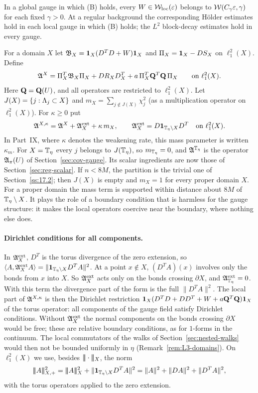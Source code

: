 In a global gauge in which (B) holds, every $W\in\mathcal W_{\rm loc}(\varepsilon)$ belongs to $\mathcal W(C_\gamma\varepsilon,\gamma)$ for each fixed $\gamma>0$. At a regular background the corresponding H\"older estimates hold in each local gauge in which (B) holds; the $L^2$ block-decay estimates hold in every gauge.

For a domain $X$ let $\mathfrak B_X=\mathbf 1_X(D^TD+W)\mathbf 1_X$ and $\Pi_X=\mathbf 1_X-DS_X$ on $\ell^2_1(X)$. Define
\[
\mathfrak A^X=\Pi_X^T\mathfrak B_X\Pi_X+DR_XD^T_X+a\,\Pi_X^T\mathbf Q^T\mathbf Q\,\Pi_X\qquad\text{on }\ell^2_1(X).
\]
Here $\mathbf Q=\mathbf Q(U)$, and all operators are restricted to $\ell^2_1(X)$. Let $J(X)=\{j:\Lambda_j\subset X\}$ and $m_X=\sum_{j\notin J(X)}\chi_j^2$ (as a multiplication operator on $\ell^2_1(X)$). For $\kappa\ge0$ put
\[
\mathfrak A^{X,\kappa}=\mathfrak A^X+\mathfrak A^{\rm ext}_X+\kappa\,m_X,\qquad\mathfrak A^{\rm ext}_X=D\mathbf 1_{\mathbb T_\eta\setminus X}D^T\quad\text{on }\ell^2_1(X).
\]
In Part~IX, where $\kappa$ denotes the weakening rate, this mass parameter is written $\kappa_m$.
For $X=\mathbb T_\eta$ every $j$ belongs to $J(\mathbb T_\eta)$, so $m_{\mathbb T_\eta}=0$, and $\mathfrak A^{\mathbb T_\eta}$ is the operator $\mathfrak A_\pi(U)$ of Section~\ref{sec:cov-gauge}. Its scalar ingredients are now those of Section~\ref{sec:reg-scalar}. If $n<8M$, the partition is the trivial one of Section~\ref{ss:17.2}; then $J(X)$ is empty and $m_X=1$ for every proper domain $X$. For a proper domain the mass term is supported within distance about $8M$ of $\mathbb T_\eta\setminus X$. It plays the role of a boundary condition that is harmless for the gauge structure: it makes the local operators coercive near the boundary, where nothing else does.

\paragraph{Dirichlet conditions for all components.} In $\mathfrak A^{\rm ext}_X$, $D^T$ is the torus divergence of the zero extension, so $\langle A,\mathfrak A^{\rm ext}_XA\rangle=\|\mathbf 1_{\mathbb T_\eta\setminus X}D^TA\|^2$. At a point $x\notin X$, $(D^TA)(x)$ involves only the bonds from $x$ into $X$. So $\mathfrak A^{\rm ext}_X$ acts only on the bonds crossing $\partial X$, and $\mathfrak A^{\rm ext}_{\mathbb T_\eta}=0$. With this term the divergence part of the form is the full $\|D^TA\|^2$. The local part of $\mathfrak A^{X,\kappa}$ is then the Dirichlet restriction $\mathbf 1_X(D^TD+DD^T+W+a\mathbf Q^T\mathbf Q)\mathbf 1_X$ of the torus operator: all components of the gauge field satisfy Dirichlet conditions. Without $\mathfrak A^{\rm ext}_X$ the normal components on the bonds crossing $\partial X$ would be free; these are relative boundary conditions, as for $1$-forms in the continuum. The local commutators of the walks of Section~\ref{sec:nested-walks} would then not be bounded uniformly in $\eta$ (Remark~\ref{rem:L3-domains}). On $\ell^2_1(X)$ we use, besides $|\!|\!|\cdot|\!|\!|_X$, the norm
\[
\tn A_{X,+}^2=\tn A_X^2+\|\one_{\Tf\setminus X}D^TA\|^2=\|A\|^2+\|DA\|^2+\|D^TA\|^2 ,
\]
with the torus operators applied to the zero extension.

